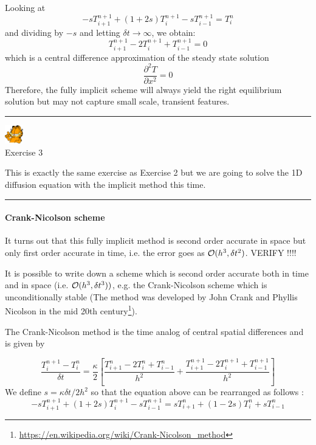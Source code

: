 Looking at
\[
-s T_{i+1}^{n+1} + (1+2s) T_{i}^{n+1} - s T_{i-1}^{n+1} = T_i^{n}
\]
and dividing by $-s$ and letting $\delta t \rightarrow \infty$, we obtain:
\[
T_{i+1}^{n+1} -2 T_{i}^{n+1} + T_{i-1}^{n+1} = 0
\]
which is a central difference approximation of the steady state solution
\[
\frac{\partial^2 T }{\partial x^2}=0
\]
Therefore, the fully implicit scheme will always yield the right equilibrium solution 
but may not capture small scale, transient features.


\begin{center}
\begin{minipage}[t]{0.77\textwidth}
\par\noindent\rule{\textwidth}{0.4pt}

\begin{center}
\includegraphics[width=0.8cm]{images/garftr} \\
{\color{orange}Exercise 3}
\end{center}

This is exactly the same exercise as Exercise 2 but we 
are going to solve the 1D diffusion equation with the implicit method
this time. 

\par\noindent\rule{\textwidth}{0.4pt}
\end{minipage}
\end{center}


\paragraph{Crank-Nicolson scheme} 
It turns out that this fully implicit method is second order accurate in space but 
only first order accurate in time,
i.e. the error goes as ${\cal O}(h^3,\delta t^2)$.   VERIFY !!!!

It is possible to write down a scheme which is second order accurate both in time and in space
(i.e. ${\cal O}(h^3, \delta t^3))$, e.g. the {\color{olive}Crank-Nicolson} scheme 
which is unconditionally stable (The method was developed by John Crank and Phyllis Nicolson 
in the mid 20th century\footnote{\url{https://en.wikipedia.org/wiki/Crank-Nicolson_method}}).

The Crank-Nicolson method is the time analog of central spatial differences and is given by

\[
\frac{T_{i}^{n+1}-T_i^n}{\delta t} 
= \frac{\kappa}{2} \left[
\frac{T_{i+1}^{n} - 2T_i^{n} + T_{i-1}^{n}}{h^2}
+
\frac{T_{i+1}^{n+1} - 2T_i^{n+1} + T_{i-1}^{n+1}}{h^2}
\right]
\]
We define $s=\kappa \delta t/ 2h^2$ so that the equation above can be rearranged as follows :
\[
\boxed{
-s T_{i+1}^{n+1} + (1+2s) T_{i}^{n+1} - s T_{i-1}^{n+1} = 
s T_{i+1}^{n} + (1-2s) T_{i}^{n} + s T_{i-1}^{n} 
}
\]


